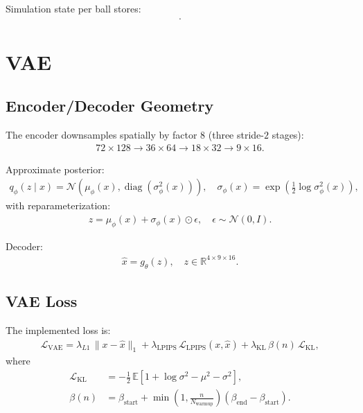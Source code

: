 \documentclass[11pt]{article}
\begin{document}
Simulation state per ball stores:
\begin{align}
[\text{pos}_x,\text{pos}_y,\text{vel}_x,\text{vel}_y].
\end{align}

\section{VAE}
\subsection{Encoder/Decoder Geometry}
The encoder downsamples spatially by factor $8$ (three stride-$2$ stages):
\begin{align}
72 \times 128 \rightarrow 36 \times 64 \rightarrow 18 \times 32 \rightarrow 9 \times 16.
\end{align}

Approximate posterior:
\begin{align}
q_\phi(z\mid x) = \mathcal{N}\!\left(\mu_\phi(x), \operatorname{diag}(\sigma_\phi^2(x))\right),\quad
\sigma_\phi(x)=\exp\!\left(\tfrac12 \log \sigma_\phi^2(x)\right),
\end{align}
with reparameterization:
\begin{align}
z = \mu_\phi(x) + \sigma_\phi(x)\odot \epsilon,\quad \epsilon\sim\mathcal{N}(0,I).
\end{align}

Decoder:
\begin{align}
\hat{x} = g_\theta(z), \quad z\in\mathbb{R}^{4\times 9\times16}.
\end{align}

\subsection{VAE Loss}
The implemented loss is:
\begin{align}
\mathcal{L}_{\text{VAE}}
=
\lambda_{L1}\,\|x-\hat{x}\|_1
 + \lambda_{\text{LPIPS}}\,\mathcal{L}_{\text{LPIPS}}(x,\hat{x})
 + \lambda_{\text{KL}}\,\beta(n)\,\mathcal{L}_{\text{KL}},
\end{align}
where
\begin{align}
\mathcal{L}_{\text{KL}}
&= -\frac12\,\mathbb{E}\left[1+\log\sigma^2-\mu^2-\sigma^2\right], \\
\beta(n)
&= \beta_{\text{start}}
+ \min\!\left(1,\frac{n}{N_{\text{warmup}}}\right)\left(\beta_{\text{end}}-\beta_{\text{start}}\right).
\end{align}
\end{document}
